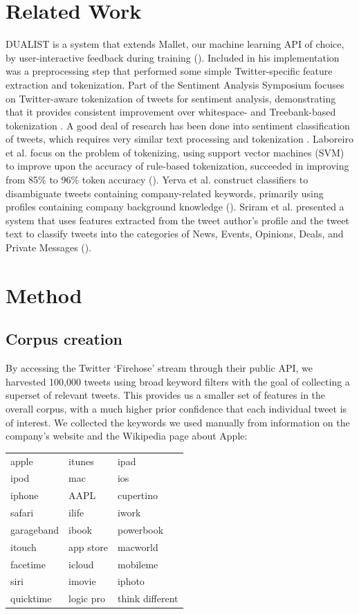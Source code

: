 \documentclass[letterpaper]{article}
\begin{document}
\section{Related Work}
DUALIST is a system that extends Mallet, our machine learning API of choice, by user-interactive feedback during training (\citeauthor{Settles:2011:CLF:2145432.2145588}). Included in his implementation was a preprocessing step that performed some simple Twitter-specific feature extraction and tokenization. Part of the Sentiment Analysis Symposium focuses on Twitter-aware tokenization of tweets for sentiment analysis, demonstrating that it provides consistent improvement over whitespace- and Treebank-based tokenization \cite{potts2011}. A good deal of research has been done into sentiment classification of tweets, which requires very similar text processing and tokenization \cite{Pak10}. Laboreiro et al. focus on the problem of tokenizing, using support vector machines (SVM) to improve upon the accuracy of rule-based tokenization, succeeded in improving from 85\% to 96\% token accuracy (\citeauthor{Laboreiro:2010:TMM:1871840.1871853}). Yerva et al. construct classifiers to disambiguate tweets containing company-related keywords, primarily using profiles containing company background knowledge (\citeauthor{journals/ijcsa/YervaMA12}). Sriram et al. presented a system that uses features extracted from the tweet author's profile and the tweet text to classify tweets into the categories of News, Events, Opinions, Deals, and Private Messages (\citeauthor{Sriram:2010:STC:1835449.1835643}).

\section{Method}
\subsection{Corpus creation}
By accessing the Twitter `Firehose' stream through their public API, we harvested 100,000 tweets using broad keyword filters with the goal of collecting a superset of relevant tweets. This provides us a smaller set of features in the overall corpus, with a much higher prior confidence that each individual tweet is of interest. We collected the keywords we used manually from information on the company's website and the Wikipedia page about Apple:\\

\begin{tabular}{l l l}
apple & itunes & ipad \\
ipod & mac & ios \\
iphone & AAPL & cupertino \\
safari&ilife&iwork \\
garageband&ibook&powerbook \\
itouch&app store&macworld \\
facetime&icloud&mobileme \\
siri&imovie&iphoto \\
quicktime&logic pro&think different
\end{tabular} \\
~\\
\end{document}
